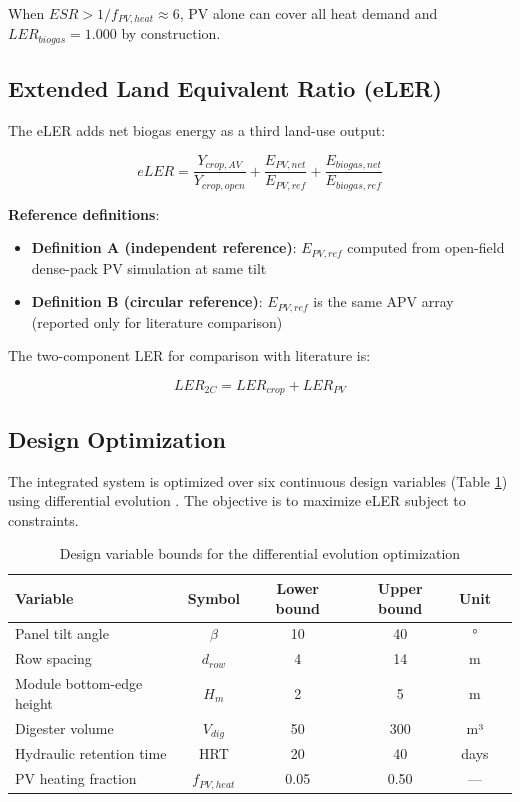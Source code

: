 \documentclass[12pt, a4paper]{article}
\begin{document}
When $ESR > 1/f_{PV,heat} \approx 6$, PV alone can cover all heat demand and $LER_{biogas} = 1.000$ by construction.

\subsection{Extended Land Equivalent Ratio (eLER)}

\hspace{1cm}The eLER adds net biogas energy as a third land-use output:

\begin{equation}
eLER = \frac{Y_{crop,AV}}{Y_{crop,open}} + \frac{E_{PV,net}}{E_{PV,ref}} + \frac{E_{biogas,net}}{E_{biogas,ref}}
\label{eq:eler}
\end{equation}

\textbf{Reference definitions}:
\begin{itemize}[leftmargin=*]
    \item \textbf{Definition A (independent reference)}: $E_{PV,ref}$ computed from open-field dense-pack PV simulation at same tilt
    \item \textbf{Definition B (circular reference)}: $E_{PV,ref}$ is the same APV array (reported only for literature comparison)
\end{itemize}

The two-component LER for comparison with literature is:

\begin{equation}
LER_{2C} = LER_{crop} + LER_{PV}
\label{eq:ler2c}
\end{equation}

\subsection{Design Optimization}

\hspace{1cm}The integrated system is optimized over six continuous design variables (Table \ref{tab:variables}) using differential evolution \cite{storn1997}. The objective is to maximize eLER subject to constraints.

\begin{table}[H]
\small
\caption{Design variable bounds for the differential evolution optimization}
\centering
\begin{tabular}{lccccc}
\toprule
\textbf{Variable} & \textbf{Symbol} & \textbf{Lower bound} & \textbf{Upper bound} & \textbf{Unit} \\
\midrule
Panel tilt angle & $\beta$ & 10 & 40 & ° \\
Row spacing & $d_{row}$ & 4 & 14 & m \\
Module bottom-edge height & $H_m$ & 2 & 5 & m \\
Digester volume & $V_{dig}$ & 50 & 300 & m³ \\
Hydraulic retention time & HRT & 20 & 40 & days \\
PV heating fraction & $f_{PV,heat}$ & 0.05 & 0.50 & — \\
\bottomrule
\end{tabular}
\label{tab:variables}
\end{table}
\end{document}
